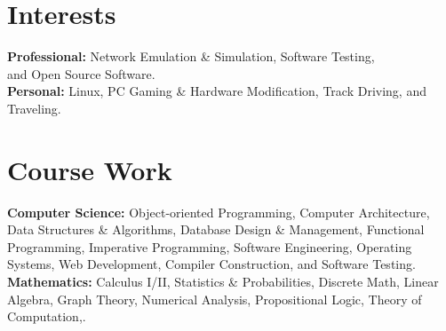 \documentclass[]{friggeri-cv} %
\begin{document}

\section{Interests}

\textbf{Professional:} Network Emulation \& Simulation, Software Testing, \\and Open Source
Software.\\
\textbf{Personal:} Linux, PC Gaming \& Hardware Modification, Track Driving, and Traveling.


\section{Course Work}

\textbf{Computer Science:}
Object-oriented Programming, Computer Architecture, \\Data Structures \& Algorithms, Database
Design \& Management, Functional Programming, Imperative Programming, Software Engineering,
Operating Systems, Web Development, Compiler Construction, and Software Testing. \\
\textbf{Mathematics:}
Calculus I/II, Statistics \& Probabilities, Discrete Math, Linear Algebra, Graph Theory, Numerical Analysis,
Propositional Logic, Theory of Computation,.

\end{document}
